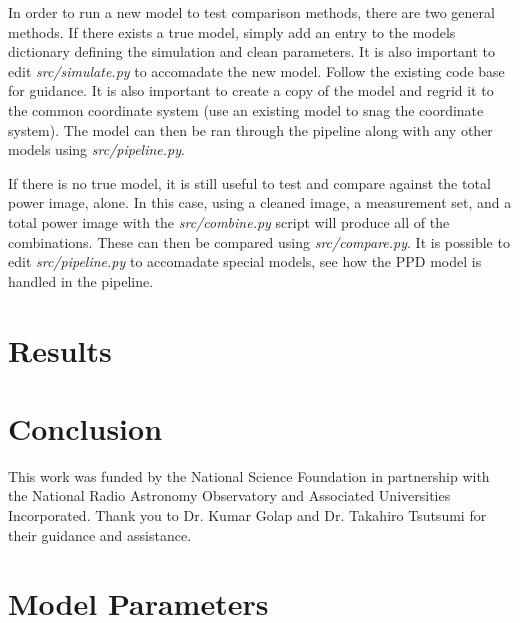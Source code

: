 \documentclass[manuscript,linenumbers]{aastex62}
\begin{document}
In order to run a new model to test comparison methods, there are two general methods. If there exists a true model, simply add an entry to the models dictionary defining the simulation and clean parameters. It is also important to edit \textit{src/simulate.py} to accomadate the new model. Follow the existing code base for guidance. It is also important to create a copy of the model and regrid it to the common coordinate system (use an existing model to snag the coordinate system). The model can then be ran through the pipeline along with any other models using \textit{src/pipeline.py}.

If there is no true model, it is still useful to test and compare against the total power image, alone. In this case, using a cleaned image, a measurement set, and a total power image with the \textit{src/combine.py} script will produce all of the combinations. These can then be compared using \textit{src/compare.py}. It is possible to edit \textit{src/pipeline.py} to accomadate special models, see how the PPD model is handled in the pipeline. 



\section{Results}

\section{Conclusion}


\acknowledgments
This work was funded by the National Science Foundation in partnership with the National Radio Astronomy Observatory and Associated Universities Incorporated. Thank you to Dr. Kumar Golap and Dr. Takahiro Tsutsumi for their guidance and assistance. 



\appendix
\section{Model Parameters}
\label{sec:models}
\end{document}
